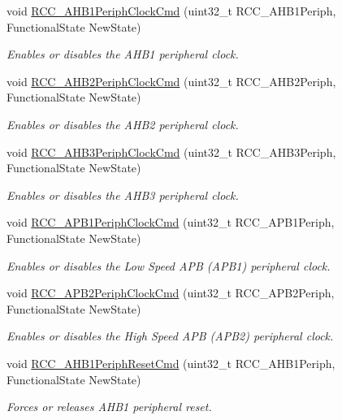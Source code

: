 \begin{DoxyCompactItemize}
void \hyperlink{group___r_c_c_ga80c89116820d48bb38db2e7d5e5a49b9}{R\+C\+C\+\_\+\+A\+H\+B1\+Periph\+Clock\+Cmd} (uint32\+\_\+t R\+C\+C\+\_\+\+A\+H\+B1\+Periph, Functional\+State New\+State)
\begin{DoxyCompactList}\small\item\em Enables or disables the A\+H\+B1 peripheral clock. \end{DoxyCompactList}\item 
void \hyperlink{group___r_c_c_gaadffedbd87e796f01d9776b8ee01ff5e}{R\+C\+C\+\_\+\+A\+H\+B2\+Periph\+Clock\+Cmd} (uint32\+\_\+t R\+C\+C\+\_\+\+A\+H\+B2\+Periph, Functional\+State New\+State)
\begin{DoxyCompactList}\small\item\em Enables or disables the A\+H\+B2 peripheral clock. \end{DoxyCompactList}\item 
void \hyperlink{group___r_c_c_ga4eb8c119f2e9bf2bd2e042d27f151338}{R\+C\+C\+\_\+\+A\+H\+B3\+Periph\+Clock\+Cmd} (uint32\+\_\+t R\+C\+C\+\_\+\+A\+H\+B3\+Periph, Functional\+State New\+State)
\begin{DoxyCompactList}\small\item\em Enables or disables the A\+H\+B3 peripheral clock. \end{DoxyCompactList}\item 
void \hyperlink{group___r_c_c_gaee7cc5d73af7fe1986fceff8afd3973e}{R\+C\+C\+\_\+\+A\+P\+B1\+Periph\+Clock\+Cmd} (uint32\+\_\+t R\+C\+C\+\_\+\+A\+P\+B1\+Periph, Functional\+State New\+State)
\begin{DoxyCompactList}\small\item\em Enables or disables the Low Speed A\+PB (A\+P\+B1) peripheral clock. \end{DoxyCompactList}\item 
void \hyperlink{group___r_c_c_ga56ff55caf8d835351916b40dd030bc87}{R\+C\+C\+\_\+\+A\+P\+B2\+Periph\+Clock\+Cmd} (uint32\+\_\+t R\+C\+C\+\_\+\+A\+P\+B2\+Periph, Functional\+State New\+State)
\begin{DoxyCompactList}\small\item\em Enables or disables the High Speed A\+PB (A\+P\+B2) peripheral clock. \end{DoxyCompactList}\item 
void \hyperlink{group___r_c_c_gaa7c450567f4731d4f0615f63586cad86}{R\+C\+C\+\_\+\+A\+H\+B1\+Periph\+Reset\+Cmd} (uint32\+\_\+t R\+C\+C\+\_\+\+A\+H\+B1\+Periph, Functional\+State New\+State)
\begin{DoxyCompactList}\small\item\em Forces or releases A\+H\+B1 peripheral reset. \end{DoxyCompactList}\item 

\end{DoxyCompactItemize}
